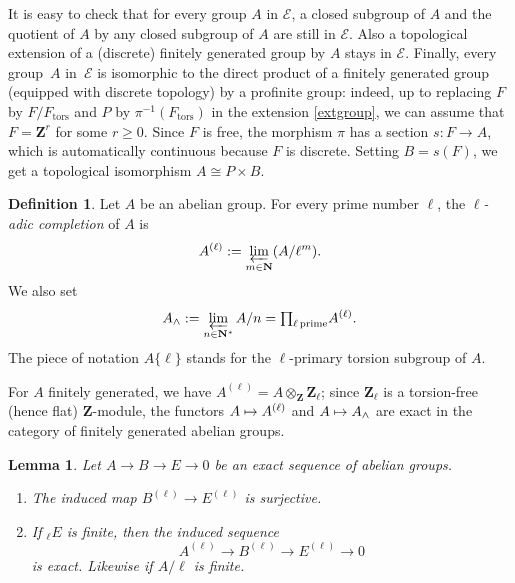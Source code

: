 \documentclass[11pt]{article}
\let\mathcal\mathscr
\newenvironment{enumeratea}
{\bgroup\def\theenumi{\alph{enumi}}\begin{enumerate}}
{\end{enumerate}\egroup}
\newcommand\mto{\mathchoice{\longmapsto}{\mapsto}{\mapsto}{\mapsto}}
\newcommand{\tprod}{{\textstyle\prod}}
\theoremstyle{plain}
\newtheorem{lem}[theo]{Lemma}
\theoremstyle{definition}
\newtheorem{defi}[theo]{Definition}
\newcommand \ZZ {\mathbf{Z}}
\newcommand \NN {\mathbf{N}}
\newcommand \tors {\mathrm{tors}}
\begin{document}
It is easy to check that
for every group $A$ in $\mathcal E$, a closed subgroup of $A$ and
the quotient of $A$ by any closed subgroup of $A$ are still in $\mathcal E$.
Also a topological extension of a (discrete) finitely generated group by $A$
stays in $\mathcal E$. Finally, every group~$A$ in~$\mathcal E$ is isomorphic
to the direct product of a finitely generated
group (equipped with discrete topology) by a profinite group: indeed, up to replacing $F$ by
$F/F_\tors$ and $P$ by $\pi^{-1}(F_\tors)$
in the extension \eqref{extgroup}, we can assume
that $F=\ZZ^r$ for some $r \geq 0$. Since $F$ is free, the morphism
$\pi$ has a section $s: F \to A$, which is automatically continuous
because $F$ is discrete. Setting $B=s(F)$, we get a topological isomorphism
$A \cong P \times B$.

\begin{defi}
Let $A$ be an abelian group. For every prime number $\ell$,
the \emph{$\ell$-adic completion} of $A$ is
\[
A^{(\ell)}:=\varprojlim_{m \in \NN} (A/\ell^m).
\] We also
set
\[
A_{\wedge}:=\varprojlim_{n \in \NN^*}
A/n=\tprod_{\ell \, \mathrm{prime}} A^{(\ell)}.
\]
The piece of notation $A \{\ell\}$ stands for the $\ell$-primary
torsion subgroup of $A$.
\end{defi}

For $A$ finitely generated, we have
$A^{(\ell)}=A \otimes_{\ZZ} \ZZ_{\ell}$; since $\ZZ_{\ell}$ is a torsion-free
(hence flat) $\ZZ$-module, the functors $A \mto A^{(\ell)}$ and
$A \mto A_{\wedge}$ are exact in the category of finitely generated
abelian groups.

\pagebreak[2]
\begin{lem} \label{exactcomp}
Let $A \to B \to E \to 0$ be an exact sequence of abelian groups.
\begin{enumeratea}
\item\label{exactcompa}
The induced map $B^{(\ell)} \to E^{(\ell)}$ is surjective.

\item\label{exactcompb}
If $_{\ell} E$ is finite, then the induced sequence
\[
A^{(\ell)} \to B^{(\ell)} \to E^{(\ell)} \to 0
\]
is exact. Likewise if $A/\ell$ is finite.
\end{enumeratea}
\end{lem}
\end{document}
